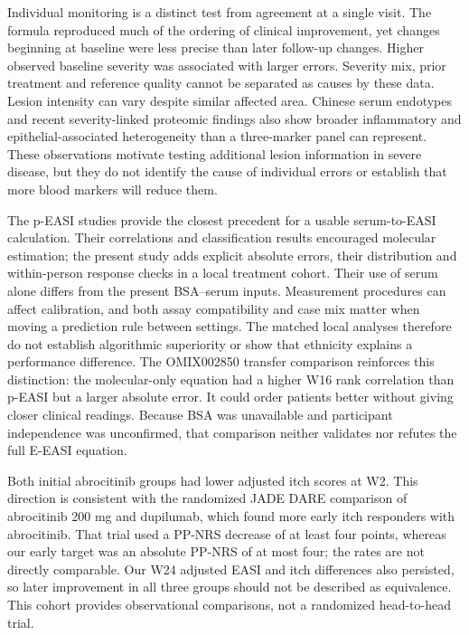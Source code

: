 \documentclass[10pt,a4paper]{article}
\begin{document}
Individual monitoring is a distinct test from agreement at a single visit. The formula reproduced much of the ordering of clinical improvement, yet changes beginning at baseline were less precise than later follow-up changes. Higher observed baseline severity was associated with larger errors. Severity mix, prior treatment and reference quality cannot be separated as causes by these data. Lesion intensity can vary despite similar affected area. Chinese serum endotypes and recent severity-linked proteomic findings also show broader inflammatory and epithelial-associated heterogeneity than a three-marker panel can represent.\citep{wu2023,lally2026} These observations motivate testing additional lesion information in severe disease, but they do not identify the cause of individual errors or establish that more blood markers will reduce them.

The p-EASI studies provide the closest precedent for a usable serum-to-EASI calculation.\citep{thijs2017,thijs2019,bakker2020} Their correlations and classification results encouraged molecular estimation; the present study adds explicit absolute errors, their distribution and within-person response checks in a local treatment cohort. Their use of serum alone differs from the present BSA--serum inputs. Measurement procedures can affect calibration, and both assay compatibility and case mix matter when moving a prediction rule between settings.\citep{luijken2020,riley2024validation} The matched local analyses therefore do not establish algorithmic superiority or show that ethnicity explains a performance difference. The OMIX002850 transfer comparison reinforces this distinction: the molecular-only equation had a higher W16 rank correlation than p-EASI but a larger absolute error. It could order patients better without giving closer clinical readings. Because BSA was unavailable and participant independence was unconfirmed, that comparison neither validates nor refutes the full E-EASI equation.

Both initial abrocitinib groups had lower adjusted itch scores at W2. This direction is consistent with the randomized JADE DARE comparison of abrocitinib 200 mg and dupilumab, which found more early itch responders with abrocitinib.\citep{reich2022dare} That trial used a PP-NRS decrease of at least four points, whereas our early target was an absolute PP-NRS of at most four; the rates are not directly comparable. Our W24 adjusted EASI and itch differences also persisted, so later improvement in all three groups should not be described as equivalence. This cohort provides observational comparisons, not a randomized head-to-head trial.
\end{document}

